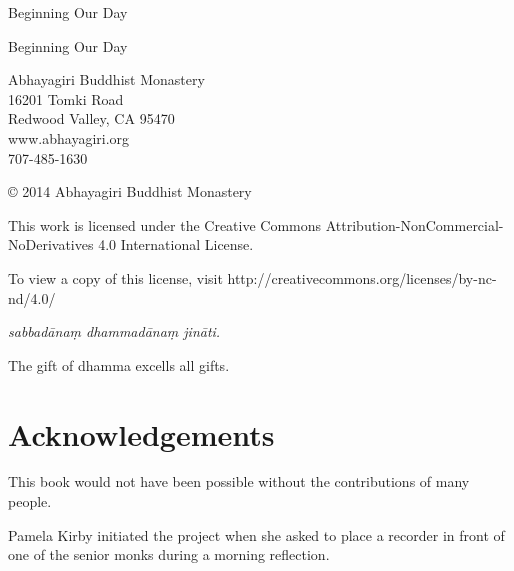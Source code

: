 \documentclass[11pt,openany]{memoir}
\begin{document}

\frontmatter
{}
\pagestyle{empty}

{\center
\vspace*{80pt}
\huge
Beginning Our Day

\par}
\clearpage

\thispagestyle{empty}
{\footnotesize\raggedright
{}

Beginning Our Day

\vspace{1em}
Abhayagiri Buddhist Monastery\\
16201 Tomki Road\\
Redwood Valley, CA 95470\\
www.abhayagiri.org\\
707-485-1630

\vspace{1em}
\copyright{} 2014 Abhayagiri Buddhist Monastery

\vspace{1em}
This work is licensed under the Creative Commons
Attribution-NonCommercial-NoDerivatives 4.0 International License.

To view a copy of this license, visit
http://creativecommons.org/licenses/by-nc-nd/4.0/

\vspace{1em}

\textit{sabbadānaṃ dhammadānaṃ jināti.}

The gift of dhamma excells all gifts.
}

\clearpage


\pagestyle{plain}
\tableofcontents*


\clearpage

\thispagestyle{empty}
\mbox{} \clearpage

\chapter{Acknowledgements}

This book would not have been possible without the contributions of many
people.

Pamela Kirby initiated the project when she asked to place a recorder in
front of one of the senior monks during a morning reflection.
\end{document}
